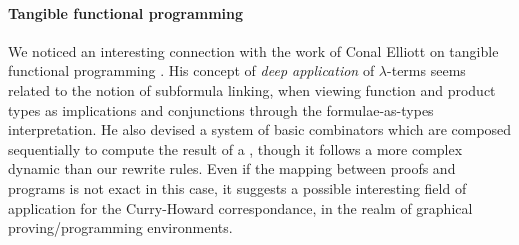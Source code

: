 
\paragraph{Tangible functional programming}

We noticed an interesting connection with the work of Conal Elliott on
tangible functional programming . His concept
of \emph{deep application} of $\lambda$-terms seems related to the
notion of subformula linking, when viewing function and product types
as implications and conjunctions through the formulae-as-types
interpretation. He also devised a system of basic combinators which
are composed sequentially to compute the result of a , though it
follows a more complex dynamic than our rewrite rules. Even if the
mapping between proofs and programs is not exact in this case, it
suggests a possible interesting field of application for the
Curry-Howard correspondance, in the realm of graphical
proving/programming environments.
